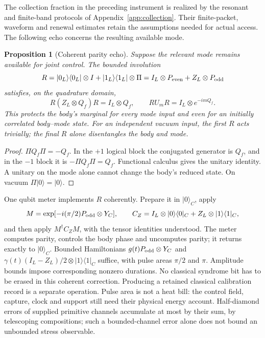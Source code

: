 \documentclass[aps,pre,onecolumn,superscriptaddress,floatfix,longbibliography]{revtex4-2}
\newtheorem{proposition}[theorem]{Proposition}
\begin{document}
The collection fraction in the preceding instrument is realized by the
resonant and finite-band protocols of Appendix~\ref{app:collection}.
Their finite-packet, waveform and renewal estimates retain the assumptions
needed for actual access. The following echo concerns the resulting
available mode.

\begin{proposition}[Coherent parity echo]
\label{prop:coherent-parity-echo}
Suppose the relevant mode remains available for joint control. The bounded
involution
\[
 R=|0_L\rangle\langle0_L|\otimes I+
   |1_L\rangle\langle1_L|\otimes\Pi
   =I_L\otimes P_{\rm even}+Z_L\otimes P_{\rm odd}
\]
satisfies, on the quadrature domain,
\begin{equation}
 R(Z_L\otimes Q_f)R=I_L\otimes Q_f,
 \qquad R U_m R=I_L\otimes e^{-imQ_f}.
 \label{eq:coherent-parity-echo}
\end{equation}
This protects the body's marginal for every mode input and even for an initially
correlated body--mode state. For an independent vacuum input, the first $R$
acts trivially; the final $R$ alone disentangles the body and mode.
\end{proposition}
\begin{proof}
$\Pi Q_f\Pi=-Q_f$. In the $+1$ logical block the conjugated generator is
$Q_f$, and in the $-1$ block it is $-\Pi Q_f\Pi=Q_f$.
Functional calculus gives the unitary identity. A unitary on the mode alone
cannot change the body's reduced state. On vacuum $\Pi|0\rangle=|0\rangle$.
\end{proof}

One qubit meter implements $R$ coherently. Prepare it in $|0\rangle_C$, apply
\[
 M=\exp[-i(\pi/2)P_{\rm odd}\otimes Y_C],
 \qquad C_Z=I_L\otimes|0\rangle\langle0|_C+
           Z_L\otimes|1\rangle\langle1|_C,
\]
and then apply $M^\dagger C_Z M$, with the tensor identities understood.
The meter computes parity, controls the body phase and uncomputes parity;
it returns exactly to $|0\rangle_C$. Bounded Hamiltonians
$g(t)P_{\rm odd}\otimes Y_C$ and
$\gamma(t)(I_L-Z_L)/2\otimes|1\rangle\langle1|_C$ suffice, with pulse areas
$\pi/2$ and $\pi$. Amplitude bounds impose corresponding nonzero durations.
No classical syndrome bit has to be erased in this coherent correction.
Producing a retained classical calibration record is a separate operation.
Pulse area is not a heat bill: the control field, capture, clock and support
still need their physical energy account. Half-diamond errors of supplied
primitive channels accumulate at most by their sum, by telescoping compositions;
such a bounded-channel error alone does not bound an unbounded stress observable.
\end{document}
